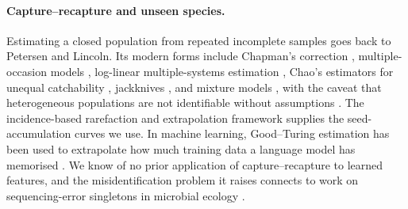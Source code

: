 \paragraph{Capture--recapture and unseen species.} Estimating a closed population from repeated incomplete samples goes back to Petersen and Lincoln. Its modern forms include Chapman's correction \citep{chapman1951some}, multiple-occasion models \citep{darroch1958multiple,otis1978statistical}, log-linear multiple-systems estimation \citep{fienberg1972multiple}, Chao's estimators for unequal catchability \citep{chao1987estimating}, jackknives \citep{burnham1978estimation}, and mixture models \citep{pledger2000unified,dorazio2003mixture}, with the caveat that heterogeneous populations are not identifiable without assumptions \citep{link2003nonidentifiability}. The incidence-based rarefaction and extrapolation framework \citep{colwell2012models} supplies the seed-accumulation curves we use. In machine learning, Good--Turing estimation \citep{good1953population} has been used to extrapolate how much training data a language model has memorised \citep{nasr2023scalable}. We know of no prior application of capture--recapture to learned features, and the misidentification problem it raises connects to work on sequencing-error singletons in microbial ecology \citep{chiu2016estimating}.
